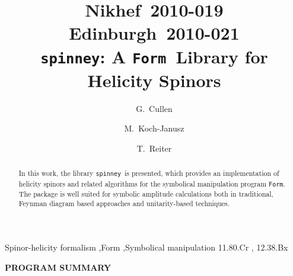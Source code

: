 \documentclass[preprint,number,12pt,sort&compress]{elsarticle}
\newcommand{\FORM}{{\texttt{Form}}}
\newcommand{\spinney}{{\texttt{spinney}}}
\begin{document}
\begin{frontmatter}
\title{\vspace{-2.5cm}\hfill {\small\rm Nikhef~2010-019}\\ 
\hfill {\small\rm Edinburgh~2010-021}\vspace{1cm}\\
\spinney: A \FORM\ Library for Helicity Spinors}

\author{G.~Cullen}
\address{%
The University of Edinburgh,
School of Physics,
Edinburgh EH9 3JZ,
UK
}

\author{M.~Koch-Janusz}
\address{Utrecht University, 3508 TC Utrecht, The Netherlands}

\author{T.~Reiter}
\address{Nikhef, Science Park 105, 1098 XG Amsterdam,
             The Netherlands}


\begin{abstract}
In this work, the library \spinney\ is presented, which provides
an implementation of helicity spinors and related algorithms
for the symbolical manipulation program \FORM. The package is
well suited for symbolic amplitude calculations both in traditional,
Feynman diagram based approaches and unitarity-based techniques.
\end{abstract}

\begin{keyword}
Spinor-helicity formalism \sep Form \sep Symbolical manipulation
\PACS 
11.80.Cr \sep
12.38.Bx 
\end{keyword}
\end{frontmatter}

{\bf PROGRAM SUMMARY}
\end{document}
